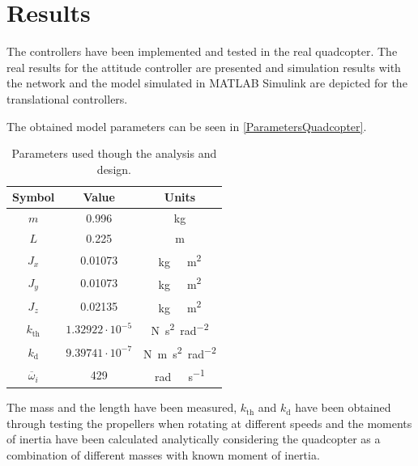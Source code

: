 \section{Results}\label{sec:results}
The controllers have been implemented and tested in the real quadcopter. The real results for the attitude controller are presented and simulation results with the network and the model simulated in MATLAB Simulink are depicted for the translational controllers. 

The obtained model parameters can be seen in \autoref{ParametersQuadcopter}. 
\begin{table}[H]
    \centering
    \begin{tabular}{c|c|c}
        \textbf{Symbol} &\textbf{Value} &\textbf{Units}\\
        \hline %
        $m$ & 0.996       &kg\\
        \hline %
        $L$  &   0.225       & m\\
        \hline %
        $J_x$  & 0.01073       & \si{kg \  m^2}\\
        \hline %
        $J_y$  & 0.01073       & \si{kg \  m^2}\\
        \hline %
        $J_z$  & 0.02135       & \si{kg \  m^2}\\
        \hline %
        $k_{\mathrm{th}}$  & $1.32922\cdot10^{-5}$       & \si{N s^2 rad^{-2}}\\
        \hline %
        $k_{\mathrm{d}}$  & $9.39741 \cdot10^{-7}$       & \si{N m s^2  rad^{-2}}\\
        \hline %
        $\overline{\omega}_i$& 429      & \si{rad \ s^{-1}}\\
        
    \end{tabular}
    \caption{Parameters used though the analysis and design.}
    \label{ParametersQuadcopter}
\end{table}
The mass and the length have been measured, $k_{\mathrm{th}}$ and $k_{\mathrm{d}}$ have been obtained through testing the propellers when rotating at different speeds and the moments of inertia have been calculated analytically considering the quadcopter as a combination of different masses with known moment of inertia.

